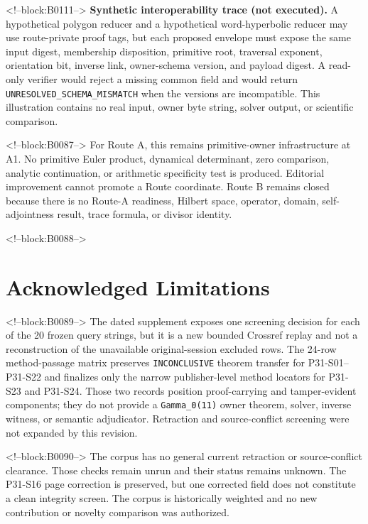 \documentclass[11pt]{article}
\begin{document}
<!--block:B0111-->
\noindent\textbf{Synthetic interoperability trace (not executed).}
A hypothetical polygon reducer and a hypothetical word-hyperbolic reducer may
use route-private proof tags, but each proposed envelope must expose the same
input digest, membership disposition, primitive root, traversal exponent,
orientation bit, inverse link, owner-schema version, and payload digest. A
read-only verifier would reject a missing common field and would return
\texttt{UNRESOLVED\_SCHEMA\_MISMATCH} when the versions are incompatible.
This illustration contains no real input, owner byte string, solver output, or
scientific comparison.

<!--block:B0087-->
For Route A, this remains primitive-owner infrastructure at A1. No
primitive Euler product, dynamical determinant, zero comparison,
analytic continuation, or arithmetic specificity test is produced.
Editorial improvement cannot promote a Route coordinate. Route B remains
closed because there is no Route-A readiness, Hilbert space, operator,
domain, self-adjointness result, trace formula, or divisor identity.

<!--block:B0088-->
\hypertarget{8-acknowledged-limitations}{%
\section{Acknowledged
Limitations}\label{8-acknowledged-limitations}}

<!--block:B0089-->
The dated supplement exposes one screening decision for each of the 20 frozen
query strings, but it is a new bounded Crossref replay and not a reconstruction
of the unavailable original-session excluded rows.  The 24-row method-passage
matrix preserves \texttt{INCONCLUSIVE} theorem transfer for P31-S01--P31-S22
and finalizes only the narrow publisher-level method locators for P31-S23 and
P31-S24.  Those two records position proof-carrying and tamper-evident components;
they do not provide a \texttt{Gamma\_0(11)} owner theorem, solver, inverse witness,
or semantic adjudicator.  Retraction and source-conflict screening were not
expanded by this revision.

<!--block:B0090-->
The corpus has no general current retraction or source-conflict
clearance. Those checks remain unrun and their status remains unknown.
The P31-S16 page correction is
preserved, but one corrected field does not constitute a clean integrity
screen. The corpus is historically weighted and no new contribution or
novelty comparison was authorized.
\end{document}
